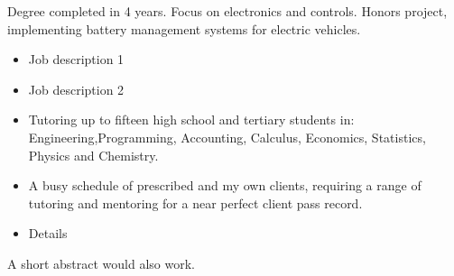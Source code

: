 \documentclass[10pt,a4paper,ragged2e,withhyper]{altacv}
\begin{document}
\begin{paracol}{2}

  Degree completed in 4 years. Focus on electronics and controls. Honors
  project, implementing battery management systems for electric
  vehicles.

  \divider




  \divider


  \switchcolumn


  \begin{itemize}
    \item Job description 1
    \item Job description 2
  \end{itemize}

  \divider

  \begin{itemize}
    \item Tutoring up to fifteen high school and tertiary students in: Engineering,Programming, Accounting, Calculus, Economics, Statistics, Physics and Chemistry.
    \item A busy schedule of prescribed and my own clients, requiring a range of tutoring and mentoring for a near perfect client pass record.

  \end{itemize}


  \begin{itemize}
    \item Details
  \end{itemize}

  \divider

  A short abstract would also work.


\end{paracol}
\end{document}
